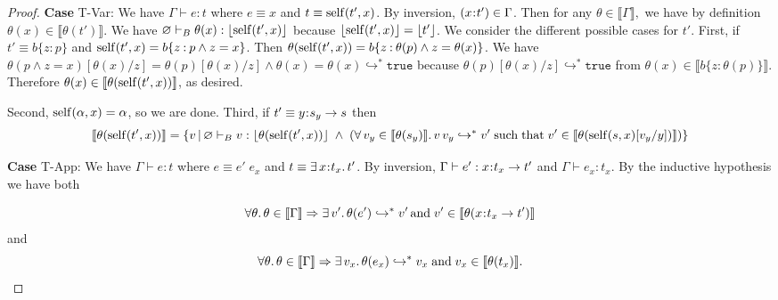 \documentclass[11pt]{article}
\newcommand{\al}{\alpha}
\newcommand{\bind}{\hspace{0.05em}{:}\hspace{0.05em}} %
\newcommand{\col}{\mathbin{:}}       %
\newcommand{\lb}{\llbracket}         %
\newcommand{\rb}{\rrbracket}         %
\newcommand{\many}{\hookrightarrow^*}
\newcommand{\true}{\mathtt{true}}
\newcommand{\existype}[3]{\exists\, #1\bind #2.\, #3}
\newcommand{\functype}[3]{#1\bind #2 \rightarrow #3}
\begin{document}
\begin{proof}
{\bf Case} {\sc T-Var}: We have $\Gamma \vdash e : t$ where $e \equiv x$ and $t \equiv {\rm self}(t', x)$. By inversion, $(x\bind t') \in \Gamma$. Then for any $\theta \in \lb\Gamma\rb,$ we have by definition $\theta(x) \in \lb \theta(t')\rb$. 
We have $\varnothing\vdash_B \theta(x) : \lfloor {\rm self}(t', x) \rfloor$ because $\lfloor {\rm self}(t', x)\rfloor = \lfloor t'\rfloor$.
We consider the different possible cases for $t'$. First, if $t' \equiv b\{z\col p\}$ and ${\rm self}(t', x) = b\{z \col p \wedge z = x\}$. Then $\theta({\rm self}(t', x)) = b\{z\col \theta(p) \wedge z = \theta(x)\}$. 
We have $\theta(p\wedge z = x)[\theta(x)/z] 
= \theta(p)[\theta(x)/z] \wedge \theta(x)=\theta(x) \many \true$
because $\theta(p)[\theta(x)/z] \many \true$ from $\theta(x)\in\lb b\{z\col \theta(p)\}\rb.$ Therefore $\theta(x) \in \lb\theta({\rm self}(t',x))\rb$, as desired. %

Second, ${\rm self}(\al, x) = \al$, so we are done. Third, if $t' \equiv \functype{y}{s_y}{s}$ then 
\[
\lb\theta({\rm self}(t',x))\rb = \{v \,|\, \varnothing \vdash_B v : \lfloor \theta({\rm self}(t',x)) \rfloor \;\wedge\; (\forall\, v_y \in \lb \theta(s_y) \rb.\, v\, v_y \many v' \;{\rm such\; that}\; v'\in \lb \theta({\rm self}(s,x)[v_y/y]) \rb ) \}
\]

{\bf Case} {\sc T-App}: We have $\Gamma \vdash e : t$ where $e \equiv e'\; e_x$ and $t \equiv \existype{x}{t_x}{t'}$. By inversion,
$\Gamma \vdash e' : \functype{x}{t_x}{t'}$ and $\Gamma \vdash e_x : t_x$. 
By the inductive hypothesis we have both
                                                                                                                                                                                                                                                                                                                                            
\begin{equation}\label{3.8.1}
\forall \theta.\, \theta\in\lb\Gamma\rb \Rightarrow \exists\, v'.\,
\theta(e') \many v' \,{\rm and}\; v' \in \lb\theta(\functype{x}{t_x}{t'})\rb\end{equation}
and
\begin{equation}\label{3.8.2}
\forall \theta.\, \theta \in \lb\Gamma\rb \Rightarrow \exists\, v_x.\,
\theta(e_x) \many v_x \;{\rm and}\; v_x \in \lb\theta(t_x)\rb.
\end{equation}


\end{proof}
\end{document}
